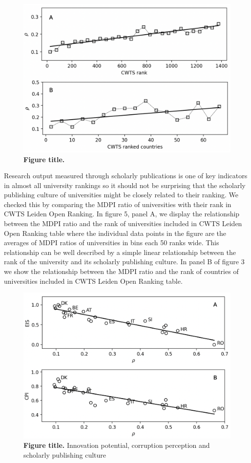 \documentclass[amsfonts, amssymb, prl, superscriptaddress, notitlepage, twocolumn, nofootinbib]{revtex4-2}
\begin{document}
\begin{figure}
    \centering
    \includegraphics[width=1.0\linewidth]{Fig03f.png}
    \caption{\label{fig:fig5} {\bf Figure title.} 
}
\end{figure}

Research output measured through scholarly publications is one of key indicators in almost all university rankings so it should not be surprising that the scholarly publishing culture of universities might be closely related to their ranking. We checked this by comparing the MDPI ratio of universities with their rank in CWTS Leiden Open Ranking. In figure 5, panel A, we display the relationship between the MDPI ratio and the rank of universities included in CWTS Leiden Open Ranking table where the individual data points in the figure are the averages of MDPI ratios of universities in bins each 50 ranks wide. This relationship can be well described by a simple linear relationship between the rank of the university and its scholarly publishing culture. In panel B of figure 3 we show the relationship between the MDPI ratio and the rank of countries of universities included in CWTS Leiden Open Ranking table. 

\begin{figure}
    \centering
    \includegraphics[width=1.0\linewidth]{Fig04f.png}
    \caption{\label{fig:fig6} {\bf Figure title.} Innovation potential, corruption perception and scholarly publishing culture
}
\end{figure}
\end{document}

